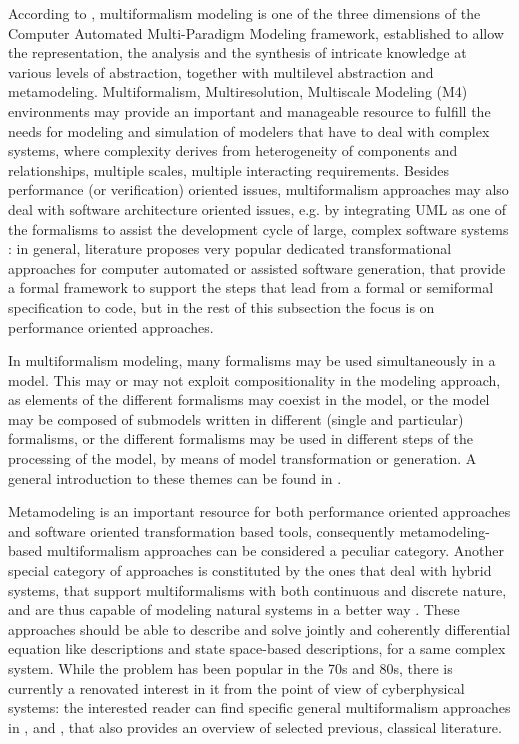 According to \cite{Mosterman2004433}, multiformalism modeling is one of the
three dimensions of the Computer Automated Multi-Paradigm Modeling framework,
established to allow the representation, the analysis and the synthesis of
intricate knowledge at various levels of abstraction, together with multilevel
abstraction and metamodeling. Multiformalism, Multiresolution, Multiscale
Modeling (M4) environments may provide \cite{Dandashi20162622} an important and
manageable resource to fulfill the needs for modeling and simulation of modelers
that have to deal with complex systems, where complexity derives from
heterogeneity of components and relationships, multiple scales, multiple interacting
requirements. Besides performance (or verification) oriented issues,
multiformalism approaches may also deal with software architecture oriented
issues, e.g. by integrating UML as one of the formalisms to assist the
development cycle of large, complex software systems \cite{Reza20044}: in
general, literature proposes very popular dedicated transformational approaches
for computer automated or assisted software generation, that provide a formal
framework to support the steps that lead from a formal or semiformal
specification to code, but in the rest of this subsection the focus is on
performance oriented approaches.

In multiformalism modeling, many formalisms may be used simultaneously in a
model. This may or may not exploit compositionality in the modeling approach, as
elements of the different formalisms may coexist in the model, or the model may
be composed of submodels written in different (single and particular) formalisms, or the
different formalisms may be used in different steps of the processing of the
model, by means of model transformation or generation. A general introduction to
these themes can be found in \cite{multiformalismbook2014-Cap1-IntroMultiformalism}.

Metamodeling is an important resource for both performance oriented approaches
\cite{Lacoste-Julien200465}\cite{Vangheluwe2003595} and software oriented
transformation based tools, consequently metamodeling-based multiformalism
approaches can be considered a peculiar category. Another special category of
approaches is constituted by the ones that deal with hybrid systems, that
support multiformalisms with both continuous and discrete nature, and are
thus capable of modeling natural systems in a better way \cite{Zeigler1998}.
These approaches should be able to describe and solve jointly and coherently
differential equation like descriptions and state space-based descriptions, for
a same complex system. While the problem has been popular in the 70s and 80s,
there is currently a renovated interest in it from the point of view of
cyberphysical systems: the interested reader can find specific general
multiformalism approaches in \cite{Zeigler2006125}, \cite{PASM2016Hybrid} and
\cite{EPEW2016}, that also provides an overview of selected previous, classical
literature.

